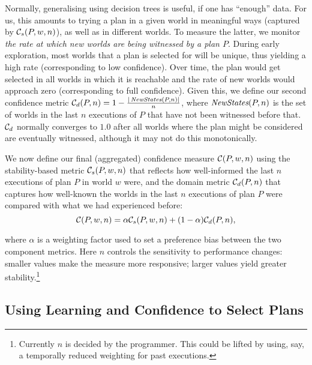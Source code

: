\newcommand{\neww}{\mathname{NewStates}}
Normally, generalising using decision trees is useful, if one has ``enough'' data. For us, this amounts to trying a plan in a given world in meaningful ways (captured by ${\mathcal{C}}_s(P,w,n)$), as well as in different worlds. 
To measure the latter, we monitor \emph{the rate at which new worlds are being witnessed by a  plan $P$}. During early exploration, most worlds that a plan is selected for will be unique, thus yielding a high rate (corresponding to low confidence). Over time, the plan would get selected in all worlds in which it is reachable and the rate of new worlds would approach zero (corresponding to full confidence). Given this, we define our second confidence metric $\C_d(P,n) = 1 - \frac{|\neww(P,n)|}{n}$, where $\neww(P,n)$ is the set of worlds in the last $n$ executions of $P$ that have not been witnessed before that. ${\mathcal{C}}_d$ normally converges to $1.0$ after all worlds where the plan might be considered are eventually witnessed, although it may not do this monotonically.

We now define our final (aggregated) confidence measure ${\mathcal{C}}(P,w,n)$ using the stability-based metric ${\mathcal{C}}_s(P,w,n)$ that reflects how well-informed the last $n$ executions of plan $P$ in world $w$ were, and the domain metric ${\mathcal{C}}_d(P,n)$ that captures how well-known the worlds in the last $n$ executions of plan $P$ were compared with what we had experienced before:
\[
	{\mathcal{C}}(P,w,n) = \alpha{\ensuremath{\mathcal{C}}}_s(P,w,n) + (1-\alpha){\mathcal{C}}_d(P,n),
\label{eqn:confidence}
\]

\noindent
where $\alpha$ is a weighting factor used to set a preference bias between the two component metrics.
%
Here $n$ controls the sensitivity to performance changes: smaller values make the measure more responsive; larger values yield greater stability.\footnote{Currently $n$ is decided by the programmer. This could be lifted by using, say, a temporally reduced weighting for past executions.}





\subsection{Using Learning and Confidence to Select Plans}\label{sec:selection}

\newcommand{\aSet}{\mathname{set}}
\newcommand{\aOperate}{\mathname{operate}}
\newcommand{\aEvaluate}{\mathname{evaluate}}

\newcommand{\pSet}{\mathname{Set*}}
\newcommand{\pSetCharge}{\mathname{SetCharge}}
\newcommand{\pSetDischarge}{\mathname{SetDischarge}}
\newcommand{\pSetNotUsed}{\mathname{SetNotUsed}}
\newcommand{\pExecute}{\mathname{Execute}}


